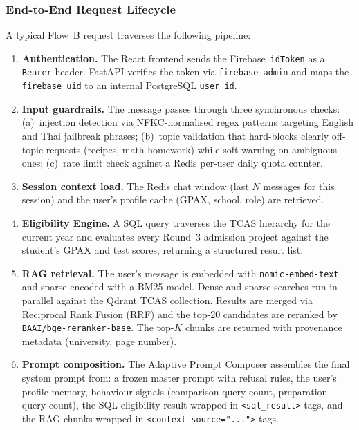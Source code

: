 ﻿\documentclass[12pt,a4paper]{article}
\begin{document}
\subsubsection{End-to-End Request Lifecycle}

A typical Flow~B request traverses the following pipeline:

\begin{enumerate}
    \item \textbf{Authentication.} The React frontend sends the Firebase~\texttt{idToken}
    as a \texttt{Bearer} header. FastAPI verifies the token via \texttt{firebase-admin}
    and maps the \texttt{firebase\_uid} to an internal PostgreSQL \texttt{user\_id}.

    \item \textbf{Input guardrails.} The message passes through three synchronous
    checks: (a)~injection detection via NFKC-normalised regex patterns targeting
    English and Thai jailbreak phrases; (b)~topic validation that hard-blocks clearly
    off-topic requests (recipes, math homework) while soft-warning on ambiguous ones;
    (c)~rate limit check against a Redis per-user daily quota counter.

    \item \textbf{Session context load.} The Redis chat window (last $N$ messages for
    this session) and the user's profile cache (GPAX, school, role) are retrieved.

    \item \textbf{Eligibility Engine.} A SQL query traverses the TCAS hierarchy for
    the current year and evaluates every Round~3 admission project against the
    student's GPAX and test scores, returning a structured result list.

    \item \textbf{RAG retrieval.} The user's message is embedded with
    \texttt{nomic-embed-text} and sparse-encoded with a BM25 model. Dense and sparse
    searches run in parallel against the Qdrant TCAS collection. Results are merged
    via Reciprocal Rank Fusion (RRF) and the top-20 candidates are reranked by
    \texttt{BAAI/bge-reranker-base}. The top-$K$ chunks are returned with provenance
    metadata (university, page number).

    \item \textbf{Prompt composition.} The Adaptive Prompt Composer assembles the
    final system prompt from: a frozen master prompt with refusal rules, the user's
    profile memory, behaviour signals (comparison-query count, preparation-query
    count), the SQL eligibility result wrapped in \texttt{<sql\_result>} tags, and
    the RAG chunks wrapped in \texttt{<context source="...">} tags.


\end{enumerate}
\end{document}

